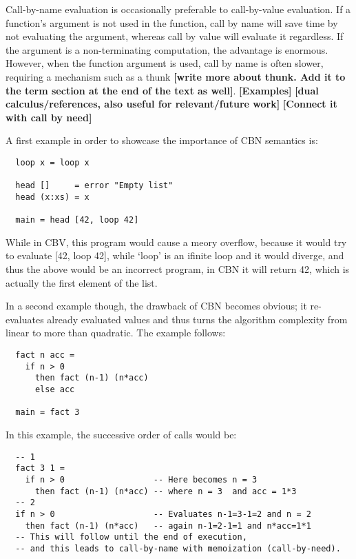 \documentclass[diploma]{softlab-thesis}
\begin{document}
Call-by-name evaluation is occasionally preferable to call-by-value evaluation. If a function's argument is not used 
in the function, call by name will save time by not evaluating the argument, whereas call by value will evaluate it regardless. 
If the argument is a non-terminating computation, the advantage is enormous. However, when the function argument is used, 
call by name is often slower, requiring a mechanism such as a thunk \textbf{[write more about thunk. 
Add it to the term section at the end of the text as well]}.
\textbf{[Examples]}
\textbf{[dual calculus/references, also useful for relevant/future work]}
\textbf{[Connect it with call by need]}

A first example in order to showcase the importance of CBN semantics is:

\begin{verbatim}
  loop x = loop x

  head []     = error "Empty list"
  head (x:xs) = x

  main = head [42, loop 42]
\end{verbatim}

While in CBV, this program would cause a meory overflow, because it would try to evaluate [42, loop 42],
while `loop' is an ifinite loop and it would diverge, and thus the above would be an incorrect program, 
in CBN it will return 42, which is actually the first element of the list.

In a second example though, the drawback of CBN becomes obvious; it re-evaluates already evaluated values and thus 
turns the algorithm complexity from linear to more than quadratic. The example follows:

\begin{verbatim}
  fact n acc = 
    if n > 0 
      then fact (n-1) (n*acc)
      else acc

  main = fact 3
\end{verbatim}

In this example, the successive order of calls would be:
\begin{verbatim}
  -- 1 
  fact 3 1 = 
    if n > 0                  -- Here becomes n = 3
      then fact (n-1) (n*acc) -- where n = 3  and acc = 1*3
  -- 2
  if n > 0                    -- Evaluates n-1=3-1=2 and n = 2 
    then fact (n-1) (n*acc)   -- again n-1=2-1=1 and n*acc=1*1
  -- This will follow until the end of execution, 
  -- and this leads to call-by-name with memoization (call-by-need).
\end{verbatim}
\end{document}
